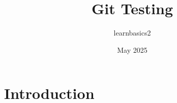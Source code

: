 \documentclass{article}
\title{Git Testing}
\author{learnbasics2 }
\date{May 2025}
\begin{document}
\maketitle

\section{Introduction}
\end{document}
